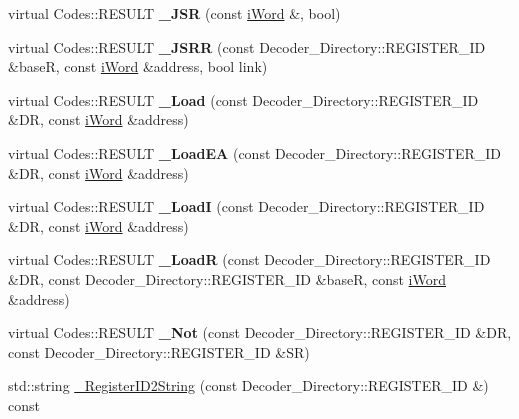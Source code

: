 \begin{DoxyCompactItemize}
\item 
\hypertarget{classWi11_a52b3325579e31ff96b4b441e682f7a9d}{
virtual Codes::RESULT {\bfseries \_\-JSR} (const \hyperlink{classiWord}{iWord} \&, bool)}
\label{classWi11_a52b3325579e31ff96b4b441e682f7a9d}

\item 
\hypertarget{classWi11_ac9b81d78bd364390dbe12bb29c3f0967}{
virtual Codes::RESULT {\bfseries \_\-JSRR} (const Decoder\_\-Directory::REGISTER\_\-ID \&baseR, const \hyperlink{classiWord}{iWord} \&address, bool link)}
\label{classWi11_ac9b81d78bd364390dbe12bb29c3f0967}

\item 
\hypertarget{classWi11_a0538e8d3ca35e6ca84646ae4b81ad5bd}{
virtual Codes::RESULT {\bfseries \_\-Load} (const Decoder\_\-Directory::REGISTER\_\-ID \&DR, const \hyperlink{classiWord}{iWord} \&address)}
\label{classWi11_a0538e8d3ca35e6ca84646ae4b81ad5bd}

\item 
\hypertarget{classWi11_a8b78bd154ed91178ea798bfd83bdc781}{
virtual Codes::RESULT {\bfseries \_\-LoadEA} (const Decoder\_\-Directory::REGISTER\_\-ID \&DR, const \hyperlink{classiWord}{iWord} \&address)}
\label{classWi11_a8b78bd154ed91178ea798bfd83bdc781}

\item 
\hypertarget{classWi11_a1eabd2329888b4ac7785fe67a066f814}{
virtual Codes::RESULT {\bfseries \_\-LoadI} (const Decoder\_\-Directory::REGISTER\_\-ID \&DR, const \hyperlink{classiWord}{iWord} \&address)}
\label{classWi11_a1eabd2329888b4ac7785fe67a066f814}

\item 
\hypertarget{classWi11_aff3d7b77430caa90933276c664c303fc}{
virtual Codes::RESULT {\bfseries \_\-LoadR} (const Decoder\_\-Directory::REGISTER\_\-ID \&DR, const Decoder\_\-Directory::REGISTER\_\-ID \&baseR, const \hyperlink{classiWord}{iWord} \&address)}
\label{classWi11_aff3d7b77430caa90933276c664c303fc}

\item 
\hypertarget{classWi11_ad343c78722e67d6bcfa8f5f52c525a97}{
virtual Codes::RESULT {\bfseries \_\-Not} (const Decoder\_\-Directory::REGISTER\_\-ID \&DR, const Decoder\_\-Directory::REGISTER\_\-ID \&SR)}
\label{classWi11_ad343c78722e67d6bcfa8f5f52c525a97}

\item 
\hypertarget{classWi11_a1dcc11c26d454f639b1a924966ede86c}{
std::string \hyperlink{classWi11_a1dcc11c26d454f639b1a924966ede86c}{\_\-RegisterID2String} (const Decoder\_\-Directory::REGISTER\_\-ID \&) const }
\label{classWi11_a1dcc11c26d454f639b1a924966ede86c}


\end{DoxyCompactItemize}
